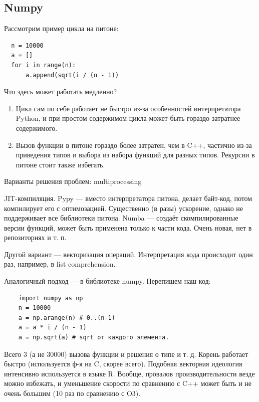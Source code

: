 \documentclass{book}
\begin{document}
\subsection{Numpy}

Рассмотрим пример цикла на питоне:
\begin{verbatim}
  n = 10000
  a = []
  for i in range(n):
      a.append(sqrt(i / (n - 1))
\end{verbatim}
Что здесь может работать медленно?
\begin{enumerate}
    \item Цикл сам по себе работает не быстро из-за особенностей интерпретатора
        Python, и при простом содержимом цикла может быть гораздо затратнее
        содержимого.
    \item Вызов функции в питоне гораздо более затратен, чем в C++, частично
        из-за приведения типов и выбора из набора функций для разных типов.
        Рекурсии в питоне стоит также избегать.
\end{enumerate}

Варианты решения проблем: multiprocessing

JIT-компиляция. Pypy --- вместо интерпретатора питона,
делает байт-код, потом компилирует его с оптимозацией. Существенно (в разы)
ускорение, однако не поддерживает все библиотеки питона. Numba --- создаёт
скомпилированные версии функций, может быть применена только к части кода. Очень
новая, нет в репозиториях и т. п.

Другой вариант --- векторизация операций. Интерпретация кода происходит один
раз, например, в list comprehension.

Аналогичный подход --- в библиотеке numpy. Перепишем наш код:
\begin{verbatim}
    import numpy as np
    n = 10000
    a = np.arange(n) # 0..(n-1)
    a = a * i / (n - 1)
    a = np.sqrt(a) # sqrt от каждого элемента.
\end{verbatim}
Всего 3 (а не 30000) вызова функции и решения о типе и т. д. Корень работает
быстро (используется ф-я на C, скорее всего). Подобная векторная идеология
интенсивно используется в языке R. Вообще, провалов производительности везде
можно избежать, и уменьшение скорости по сравнению с C++ может быть и не очень
большим (10 раз по сравнению с O3).
\end{document}
